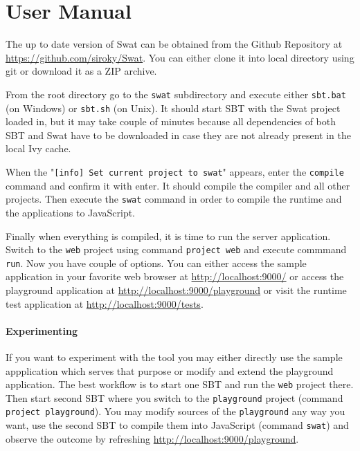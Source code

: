 \documentclass[12pt,a4paper]{report}
\begin{document}
\def\bibname{Bibliography}





\appendix
\appendixpage
\addappheadtotoc

\chapter{User Manual}

The up to date version of Swat can be obtained from the Github Repository at \url{https://github.com/siroky/Swat}. You can either clone it into local directory using git or download it as a ZIP archive.

From the root directory go to the \texttt{swat} subdirectory and execute either \texttt{sbt.bat} (on Windows) or \texttt{sbt.sh} (on Unix). It should start SBT with the Swat project loaded in, but it may take couple of minutes because all dependencies of both SBT and Swat have to be downloaded in case they are not already present in the local Ivy cache.

When the "\texttt{[info] Set current project to swat}" appears, enter the \texttt{compile} command and confirm it with enter. It should compile the compiler and all other projects. Then execute the \texttt{swat} command in order to compile the runtime and the applications to JavaScript.

Finally when everything is compiled, it is time to run the server application. Switch to the \texttt{web} project using command \texttt{project web} and execute commmand \texttt{run}. Now you have couple of options. You can either access the sample application in your favorite web browser at \url{http://localhost:9000/} or access the playground application at \url{http://localhost:9000/playground} or visit the runtime test application at \url{http://localhost:9000/tests}.

\subsubsection*{Experimenting}

If you want to experiment with the tool you may either directly use the sample appplication which serves that purpose or modify and extend the playground application. The best workflow is to start one SBT and run the \texttt{web} project there. Then start second SBT where you switch to the \texttt{playground} project (command \texttt{project playground}). You may modify sources of the \texttt{playground} any way you want, use the second SBT to compile them into JavaScript (command \texttt{swat}) and observe the outcome by refreshing \url{http://localhost:9000/playground}.
\end{document}
